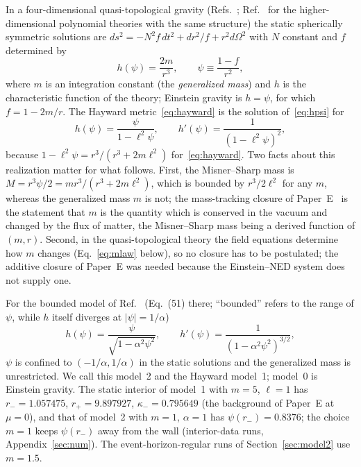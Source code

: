 \documentclass[11pt]{article}
\begin{document}
In a four-dimensional quasi-topological gravity (Refs.~\cite{BuenoCanoHennigarMurcia2025,BorissovaCarballoRubio2026}; Ref.~\cite{BuenoCanoHennigar2024} for the higher-dimensional polynomial theories with the same structure) the static spherically symmetric solutions are $ds^{2}=-N^{2}f\,dt^{2}+dr^{2}/f+r^{2}d\Omega^{2}$ with $N$ constant and $f$ determined by
\begin{equation}
h(\psi)=\frac{2m}{r^{3}},\qquad \psi\equiv\frac{1-f}{r^{2}},
\label{eq:hpsi}
\end{equation}
where $m$ is an integration constant (the \emph{generalized mass}) and $h$ is the characteristic function of the theory; Einstein gravity is $h=\psi$, for which $f=1-2m/r$. The Hayward metric~\eqref{eq:hayward} is the solution of~\eqref{eq:hpsi} for
\begin{equation}
h(\psi)=\frac{\psi}{1-\ell^{2}\psi},\qquad h'(\psi)=\frac{1}{(1-\ell^{2}\psi)^{2}},
\label{eq:hH}
\end{equation}
because $1-\ell^{2}\psi=r^{3}/(r^{3}+2m\ell^{2})$ for~\eqref{eq:hayward}. Two facts about this realization matter for what follows. First, the Misner--Sharp mass is $M=r^{3}\psi/2=mr^{3}/(r^{3}+2m\ell^{2})$, which is bounded by $r^{3}/2\ell^{2}$ for any $m$, whereas the generalized mass $m$ is not; the mass-tracking closure of Paper~E~\citep{PaperE} is the statement that $m$ is the quantity which is conserved in the vacuum and changed by the flux of matter, the Misner--Sharp mass being a derived function of $(m,r)$. Second, in the quasi-topological theory the field equations determine how $m$ changes (Eq.~\eqref{eq:mlaw} below), so no closure has to be postulated; the additive closure of Paper~E was needed because the Einstein--NED system does not supply one.

For the bounded model of Ref.~\cite{BuenoCanoHennigarMurcia2025} (Eq.~(51) there; ``bounded'' refers to the range of $\psi$, while $h$ itself diverges at $|\psi|=1/\alpha$)
\begin{equation}
h(\psi)=\frac{\psi}{\sqrt{1-\alpha^{2}\psi^{2}}},\qquad h'(\psi)=\frac{1}{(1-\alpha^{2}\psi^{2})^{3/2}},
\label{eq:hB}
\end{equation}
$\psi$ is confined to $(-1/\alpha,1/\alpha)$ in the static solutions and the generalized mass is unrestricted. We call this model~2 and the Hayward model~1; model~0 is Einstein gravity. The static interior of model~1 with $m=5$, $\ell=1$ has $r_-=1.057475$, $r_+=9.897927$, $\kappa_-=0.795649$ (the background of Paper~E at $\mu=0$), and that of model~2 with $m=1$, $\alpha=1$ has $\psi(r_-)=0.8376$; the choice $m=1$ keeps $\psi(r_-)$ away from the wall (interior-data runs, Appendix~\ref{sec:num}). The event-horizon-regular runs of Section~\ref{sec:model2} use $m=1.5$.
\end{document}

